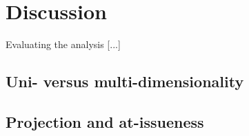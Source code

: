 \section{Discussion}

Evaluating the analysis [...]

\subsection{Uni- versus multi-dimensionality}

\citet{schlenker2013supplements}

\subsection{Projection and at-issueness}

\citet{simons2010projects}



